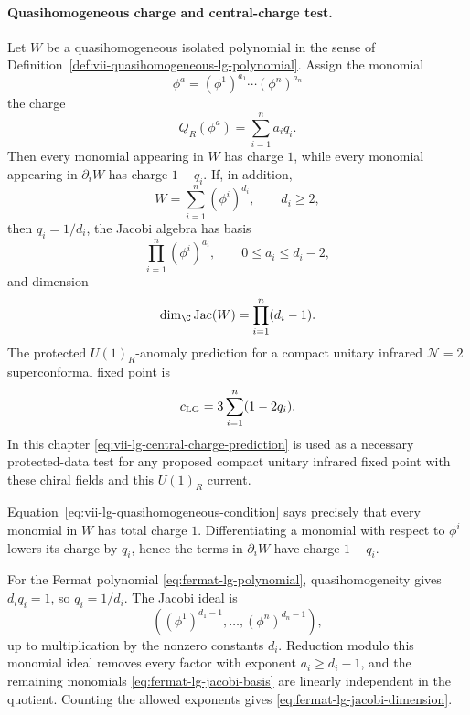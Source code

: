 \paragraph{Quasihomogeneous charge and central-charge test.}
Let \(W\) be a quasihomogeneous isolated polynomial in the sense of
Definition~\ref{def:vii-quasihomogeneous-lg-polynomial}.  Assign the monomial
\[
  \phi^a=(\phi^1)^{a_1}\cdots(\phi^n)^{a_n}
\]
the charge
\begin{equation}
  Q_R(\phi^a)=\sum_{i=1}^n a_iq_i .
  \label{eq:vii-lg-monomial-charge}
\end{equation}
Then every monomial appearing in \(W\) has charge \(1\), while every monomial
appearing in \(\partial_iW\) has charge \(1-q_i\).  If, in addition,
\begin{equation}
  W=\sum_{i=1}^n(\phi^i)^{d_i},
  \qquad d_i\geq2,
  \label{eq:fermat-lg-polynomial}
\end{equation}
then \(q_i=1/d_i\), the Jacobi algebra has basis
\begin{equation}
  \prod_{i=1}^n(\phi^i)^{a_i},
  \qquad
  0\leq a_i\leq d_i-2,
  \label{eq:fermat-lg-jacobi-basis}
\end{equation}
and dimension
\begin{equation}
  \dim_\C\operatorname{Jac}(W)=\prod_{i=1}^n(d_i-1).
  \label{eq:fermat-lg-jacobi-dimension}
\end{equation}
The protected \(U(1)_R\)-anomaly prediction for a compact unitary infrared
\(\mathcal N=2\) superconformal fixed point is
\begin{equation}
  c_{\rm LG}=3\sum_{i=1}^n(1-2q_i).
  \label{eq:vii-lg-central-charge-prediction}
\end{equation}
In this chapter \eqref{eq:vii-lg-central-charge-prediction} is used as a
necessary protected-data test for any proposed compact unitary infrared fixed
point with these chiral fields and this \(U(1)_R\) current.

Equation~\eqref{eq:vii-lg-quasihomogeneous-condition} says precisely that
every monomial in \(W\) has total charge \(1\).  Differentiating a monomial
with respect to \(\phi^i\) lowers its charge by \(q_i\), hence the terms in
\(\partial_iW\) have charge \(1-q_i\).

For the Fermat polynomial \eqref{eq:fermat-lg-polynomial},
quasihomogeneity gives \(d_iq_i=1\), so \(q_i=1/d_i\).  The Jacobi ideal is
\[
  ((\phi^1)^{d_1-1},\ldots,(\phi^n)^{d_n-1}),
\]
up to multiplication by the nonzero constants \(d_i\).  Reduction modulo this
monomial ideal removes every factor with exponent \(a_i\geq d_i-1\), and the
remaining monomials \eqref{eq:fermat-lg-jacobi-basis} are linearly
independent in the quotient.  Counting the allowed exponents gives
\eqref{eq:fermat-lg-jacobi-dimension}.

